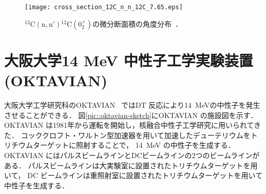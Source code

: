 \documentclass[../master]{subfiles}
\begin{document}
\begin{figure}
  \centering
  \texttt{[image: cross\_section\_12C\_n\_n\_12C\_7.65.eps]}
  \caption[${}^{12}\mathrm{C}(\mathrm{n},\mathrm{n}'){}^{12}\mathrm{C} (0_2^+)$の微分断面積の角度分布．]
          {${}^{12}\mathrm{C}(\mathrm{n},\mathrm{n}'){}^{12}\mathrm{C} (0_2^+)$の微分断面積の角度分布~\cite{kondoetal}．}
  \label{fig::sig_angle_dist}
\end{figure}

\section{大阪大学14 MeV 中性子工学実験装置 (OKTAVIAN)}
大阪大学工学研究科のOKTAVIAN~\cite{oktavian} ではDT 反応により\SI{14}{\mega\electronvolt}の中性子を発生させることができる．
図\ref{pic::oktavian-sketch}にOKTAVIAN の施設図を示す．
OKTAVIAN は1981年から運転を開始し，核融合中性子工学研究に用いられてきた．
コッククロフト・ワルトン型加速器を用いて加速したデューテリウムをトリチウムターゲットに照射することで，
\SI{14}{\mega\electronvolt} の中性子を生成する．
OKTAVIAN にはパルスビームラインとDCビームラインの2つのビームラインがある．
パルスビームラインは大実験室に設置されたトリチウムターゲットを用いて，
DC ビームラインは重照射室に設置されたトリチウムターゲットを用いて中性子を生成する．
\end{document}

